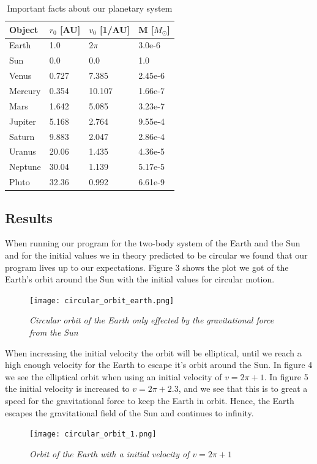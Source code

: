 \documentclass[a4paper,12pt, english]{article}
\begin{document}
\begin{table} [h!]
\caption{Important facts about our planetary system}
\centering
\begin{tabular}{l | l l l} 
\hline
Object & $r_0$ [AU] & $v_0$ [1/AU] & M [$M_{\odot}$]\\
\hline
Earth & 1.0 & $2\pi$ & 3.0e-6  \\ [0.5ex]
Sun & 0.0 & 0.0 & 1.0 \\
Venus & 0.727 & 7.385 & 2.45e-6 \\
Mercury & 0.354 & 10.107 & 1.66e-7 \\
Mars & 1.642 & 5.085 & 3.23e-7 \\
Jupiter & 5.168 & 2.764 & 9.55e-4 \\
Saturn & 9.883 & 2.047 & 2.86e-4 \\
Uranus  & 20.06 & 1.435 & 4.36e-5 \\
Neptune & 30.04 & 1.139 & 5.17e-5 \\
Pluto & 32.36 & 0.992 & 6.61e-9 
\end{tabular}
\end{table}


\subsection*{Results}
When running our program for the two-body system of the Earth and the Sun and for the initial values we in theory predicted to be circular we found that our program lives up to our expectations. Figure 3 shows the plot we got of the Earth's orbit around the Sun with the initial values for circular motion.

\begin{figure}[h!]
  \centering
    \texttt{[image: circular\_orbit\_earth.png]}
  \caption{\textit{Circular orbit of the Earth only effected by the gravitational force from the Sun}}
\end{figure}


When increasing the initial velocity the orbit will be elliptical, until we reach a high enough velocity for the Earth to escape it's orbit around the Sun. In figure 4 we see the elliptical orbit when using an initial velocity of $v = 2 \pi +1$. In figure 5 the initial velocity is increased to $v = 2 \pi + 2.3$, and we see that this is to great a speed for the gravitational force to keep the Earth in orbit. Hence, the Earth escapes the gravitational field of the Sun and continues to infinity.  

\begin{figure}[h!]
  \centering
    	\texttt{[image: circular\_orbit\_1.png]}
  \caption{\textit{Orbit of the Earth with a initial velocity of $v = 2 \pi +1$}}
\end{figure}
\end{document}
